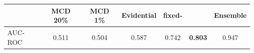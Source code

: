 \begin{tabular}{lccccc|c}
\toprule
{} & MCD 20\% & MCD 1\% & Evidential & fixed-\oursacro{} & \oursacro{} & Ensemble\\
\midrule
AUC-ROC & 0.511 & 0.504 & 0.587 & 0.742 & \textbf{0.803} & 0.947\\
\bottomrule
\end{tabular}

